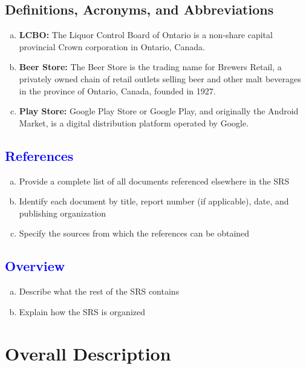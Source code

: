 \documentclass[]{article}
\begin{document}
\subsection{Definitions, Acronyms, and Abbreviations}
\label{sub:definitions_acronyms_and_abbreviations}
\begin{enumerate}[a)]
	\item \textbf{LCBO: } The Liquor Control Board of Ontario is a non-share capital provincial Crown corporation in Ontario, Canada.
	\item \textbf{Beer Store: } The Beer Store is the trading name for Brewers Retail, a privately owned chain of retail outlets selling beer and other malt beverages in the province of Ontario, Canada, founded in 1927.
	\item \textbf{Play Store: } Google Play Store or Google Play, and originally the Android Market, is a digital distribution platform operated by Google.
\end{enumerate}

\subsection{\textcolor{blue}{References}}
\label{sub:references}
\begin{enumerate}[a)]
	\item Provide a complete list of all documents referenced elsewhere in the SRS
	\item Identify each document by title, report number (if applicable), date, and publishing organization
	\item Specify the sources from which the references can be obtained
\end{enumerate}

\subsection{\textcolor{blue}{Overview}}
\label{sub:overview}
\begin{enumerate}[a)]
	\item Describe what the rest of the SRS contains
	\item Explain how the SRS is organized
\end{enumerate}


\section{Overall Description}
\label{sec:overall_description}
\end{document}
